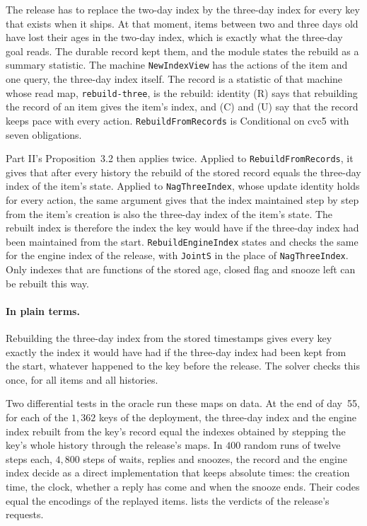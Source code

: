 \documentclass[11pt]{article}
\newcommand{\code}[1]{\texttt{#1}}
\newcommand{\plain}{\paragraph{In plain terms.}}
\theoremstyle{definition}
\theoremstyle{plain}
\begin{document}
The release has to replace the two-day index by the three-day index for every key that exists when
it ships. At that moment, items between two and three days old have lost their ages in the two-day
index, which is exactly what the three-day goal reads. The durable record kept them, and the module
states the rebuild as a summary statistic. The machine \code{NewIndexView} has the actions of the
item and one query, the three-day index itself. The record is a statistic of that machine whose read
map, \code{rebuild-three}, is the rebuild: identity (R) says that rebuilding the record of an item
gives the item's index, and (C) and (U) say that the record keeps pace with every action.
\code{RebuildFromRecords} is Conditional on cvc5 with seven obligations.

Part II's Proposition~3.2 then applies twice. Applied to \code{RebuildFromRecords}, it gives that
after every history the rebuild of the stored record equals the three-day index of the item's state.
Applied to \code{NagThreeIndex}, whose update identity holds for every action, the same argument
gives that the index maintained step by step from the item's creation is also the three-day index
of the item's state. The rebuilt index is therefore the index the key would have if the three-day
index had been maintained from the start. \code{RebuildEngineIndex} states and checks the same for
the engine index of the release, with \code{JointS} in the place of \code{NagThreeIndex}. Only
indexes that are functions of the stored age, closed flag and snooze left can be rebuilt this way.

\plain Rebuilding the three-day index from the stored timestamps gives every key exactly the index
it would have had if the three-day index had been kept from the start, whatever happened to the key
before the release. The solver checks this once, for all items and all histories.

Two differential tests in the oracle run these maps on data. At the end of day~55, for each of the
$1{,}362$ keys of the deployment, the three-day index and the engine index rebuilt from the key's
record equal the indexes obtained by stepping the key's whole history through the release's maps.
In $400$ random runs of twelve steps each, $4{,}800$ steps of waits, replies and snoozes, the record
and the engine index decide as a direct implementation that keeps absolute times: the creation
time, the clock, whether a reply has come and when the snooze ends. Their codes equal the encodings
of the replayed items.  lists the verdicts of the release's requests.
\end{document}

